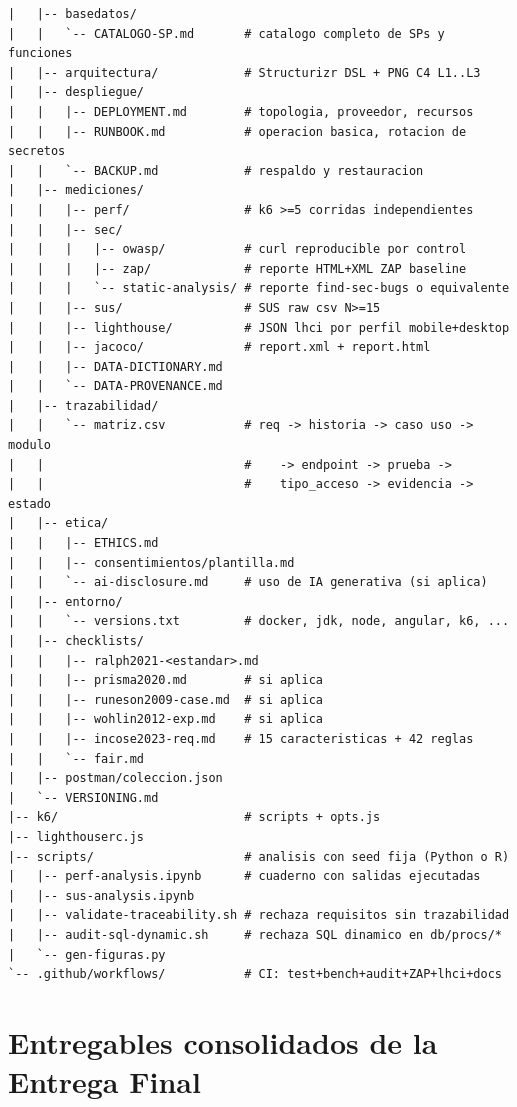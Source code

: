 \documentclass[11pt,a4paper]{article}
\begin{document}
\begin{lstlisting}[caption={Estructura minima del repositorio para la Entrega Final}]
|   |-- basedatos/
|   |   `-- CATALOGO-SP.md       # catalogo completo de SPs y funciones
|   |-- arquitectura/            # Structurizr DSL + PNG C4 L1..L3
|   |-- despliegue/
|   |   |-- DEPLOYMENT.md        # topologia, proveedor, recursos
|   |   |-- RUNBOOK.md           # operacion basica, rotacion de secretos
|   |   `-- BACKUP.md            # respaldo y restauracion
|   |-- mediciones/
|   |   |-- perf/                # k6 >=5 corridas independientes
|   |   |-- sec/
|   |   |   |-- owasp/           # curl reproducible por control
|   |   |   |-- zap/             # reporte HTML+XML ZAP baseline
|   |   |   `-- static-analysis/ # reporte find-sec-bugs o equivalente
|   |   |-- sus/                 # SUS raw csv N>=15
|   |   |-- lighthouse/          # JSON lhci por perfil mobile+desktop
|   |   |-- jacoco/              # report.xml + report.html
|   |   |-- DATA-DICTIONARY.md
|   |   `-- DATA-PROVENANCE.md
|   |-- trazabilidad/
|   |   `-- matriz.csv           # req -> historia -> caso uso -> modulo
|   |                            #    -> endpoint -> prueba ->
|   |                            #    tipo_acceso -> evidencia -> estado
|   |-- etica/
|   |   |-- ETHICS.md
|   |   |-- consentimientos/plantilla.md
|   |   `-- ai-disclosure.md     # uso de IA generativa (si aplica)
|   |-- entorno/
|   |   `-- versions.txt         # docker, jdk, node, angular, k6, ...
|   |-- checklists/
|   |   |-- ralph2021-<estandar>.md
|   |   |-- prisma2020.md        # si aplica
|   |   |-- runeson2009-case.md  # si aplica
|   |   |-- wohlin2012-exp.md    # si aplica
|   |   |-- incose2023-req.md    # 15 caracteristicas + 42 reglas
|   |   `-- fair.md
|   |-- postman/coleccion.json
|   `-- VERSIONING.md
|-- k6/                          # scripts + opts.js
|-- lighthouserc.js
|-- scripts/                     # analisis con seed fija (Python o R)
|   |-- perf-analysis.ipynb      # cuaderno con salidas ejecutadas
|   |-- sus-analysis.ipynb
|   |-- validate-traceability.sh # rechaza requisitos sin trazabilidad
|   |-- audit-sql-dynamic.sh     # rechaza SQL dinamico en db/procs/*
|   `-- gen-figuras.py
`-- .github/workflows/           # CI: test+bench+audit+ZAP+lhci+docs
\end{lstlisting}

\section{Entregables consolidados de la Entrega Final}
\end{document}

